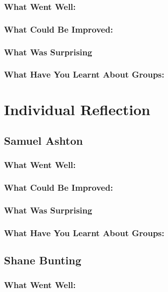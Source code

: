 \documentclass[11pt, oneside, a4paper, titlepage]{article}
\begin{document}
\subsubsection{What Went Well:}


\subsubsection{What Could Be Improved:}


\subsubsection{What Was Surprising}


\subsubsection{What Have You Learnt About Groups:}


\section{Individual Reflection}

\subsection{Samuel Ashton}
\subsubsection{What Went Well:}


\subsubsection{What Could Be Improved:}


\subsubsection{What Was Surprising}


\subsubsection{What Have You Learnt About Groups:}


\subsection{Shane Bunting}
\subsubsection{What Went Well:}
\end{document}
